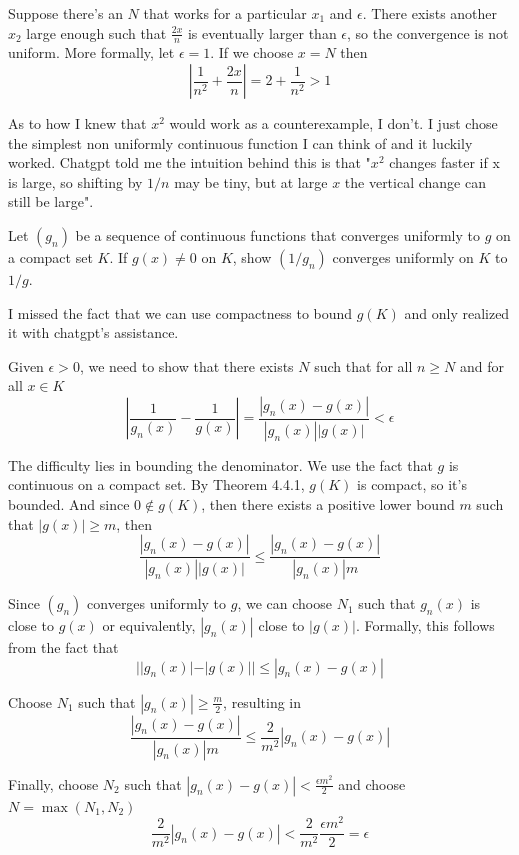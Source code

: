 \documentclass{oxmathproblems}
\begin{document}
\begin{questions}
\begin{solution}
  Suppose there's an $N$ that works for a particular $x_{1}$ and $\epsilon$. There exists another $x_{2}$ large enough such that $\frac{2x}{n}$ is eventually
  larger than $\epsilon$, so the convergence is not uniform. More formally, let $\epsilon = 1$. If we choose $x=N$ then
  \[\left|\frac{1}{n^2} + \frac{2x}{n}\right| = 2 + \frac{1}{n^2} > 1\]

  As to how I knew that $x^2$ would work as a counterexample, I don't. I just chose the simplest non uniformly continuous function I can think of and it luckily worked.
  Chatgpt told me the intuition behind this is that "$x^2$ changes faster if x is large, so shifting by $1/n$ may be tiny, but at large $x$ the vertical change can still be large".
\end{solution}

\miquestion Let $(g_{n})$ be a sequence of continuous functions that converges uniformly to $g$ on a compact set $K$. If $g(x) \neq 0$ on $K$, show $(1/g_{n})$ converges
uniformly on $K$ to $1/g$.

\begin{solution}
  I missed the fact that we can use compactness to bound $g(K)$ and only realized it with chatgpt's assistance.

  Given $\epsilon > 0$, we need to show that there exists $N$ such that for all $n \geq N$ and for all $x \in K$
  \[\left|\frac{1}{g_{n}(x)}-\frac{1}{g(x)}\right| = \frac{|g_{n}(x)-g(x)|}{|g_{n}(x)||g(x)|} < \epsilon\]

  The difficulty lies in bounding the denominator. We use the fact that $g$ is continuous on a compact set. By Theorem 4.4.1, $g(K)$ is compact, so it's bounded.
  And since $0 \notin g(K)$, then there exists a positive lower bound $m$ such that $|g(x)| \geq m$, then
  \[\frac{|g_{n}(x)-g(x)|}{|g_{n}(x)||g(x)|} \leq \frac{|g_{n}(x)-g(x)|}{|g_{n}(x)|m}\]
  
  Since $(g_{n})$ converges uniformly to $g$, we can choose $N_{1}$ such that $g_{n}(x)$ is close to $g(x)$ or equivalently, $|g_{n}(x)|$ close to $|g(x)|$. Formally,
  this follows from the fact that
  \[||g_{n}(x)|-|g(x)|| \leq |g_{n}(x)-g(x)|\]

   Choose $N_{1}$ such that $|g_{n}(x)| \geq \frac{m}{2}$, resulting in
  \[\frac{|g_{n}(x)-g(x)|}{|g_{n}(x)|m} \leq \frac{2}{m^2}|g_{n}(x)-g(x)|\]

  Finally, choose $N_{2}$ such that $|g_{n}(x)-g(x)| < \frac{\epsilon m^{2}}{2}$ and choose $N=\max(N_{1}, N_{2})$
  \[\frac{2}{m^2}|g_{n}(x)-g(x)| < \frac{2}{m^2} \frac{\epsilon m^{2}}{2} = \epsilon\]
\end{solution}


\end{questions}
\end{document}

